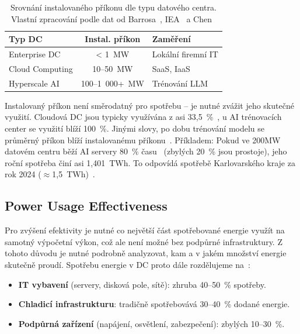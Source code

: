 \begin{table}[t] \centering

    \caption[Srovnání instalovaného příkonu]{Srovnání instalovaného příkonu dle typu datového centra. Vlastní zpracování podle dat od Barrosa~\cite{barroso_data_2026}, IEA~\cite{international_energy_agency_iea_energy_2025} a Chen~\cite{chen_electricity_2025}}
    \label{tab:energeticke_rozsahy}

    \begin{tabular}{lcl}
        \toprule
        \textbf{Typ DC} & \textbf{Instal. příkon} & \textbf{Zaměření} \\
        \midrule
        Enterprise DC & < 1~MW & Lokální firemní IT \\
        Cloud Computing & 10--50~MW & SaaS, IaaS \\
        Hyperscale AI & 100--1~000+~MW & Trénování LLM \\
        \bottomrule
    \end{tabular}

\end{table}

Instalovaný příkon není směrodatný pro spotřebu -- je nutné zvážit jeho skutečné využití. Cloudová DC jsou typicky využívána z asi 33,5~\%~\cite[s.~224]{barroso_data_2026}, u AI trénovacích center se využití blíží 100~\%. Jinými slovy, po dobu trénování modelu se průměrný příkon blíží instalovanému příkonu~\cite[s.~3]{avelar_ai_2023}. Příkladem: Pokud ve 200MW datovém centru běží AI servery 80~\% času~\cite[s.~27]{LBNL-2001637} (zbylých 20~\% jsou prostoje), jeho roční spotřeba činí asi 1,401~TWh. To odpovídá spotřebě Karlovarského kraje za rok 2024 ($\approx$1,5~TWh)~\cite{energeticky_regulacni_urad_spotreba_2024}.

\subsection{Power Usage Effectiveness}
\label{subsec:pue}

Pro zvýšení efektivity je nutné co největší část spotřebované energie využít na samotný výpočetní výkon, což ale není možné bez podpůrné infrastruktury. Z tohoto důvodu je nutné podrobně analyzovat, kam a v jakém množství energie skutečně proudí. Spotřebu energie v DC proto dále rozdělujeme na~\cite{sheng_power_2026, chen_electricity_2025}:

\begin{itemize}
    \item \textbf{IT vybavení} (servery, disková pole, sítě): zhruba 40--50~\% spotřeby.

    \item \textbf{Chladicí infrastrukturu}: tradičně spotřebovává 30--40~\% dodané energie.

    \item \textbf{Podpůrná zařízení} (napájení, osvětlení, zabezpečení): zbylých 10--30~\%.
\end{itemize}
 
